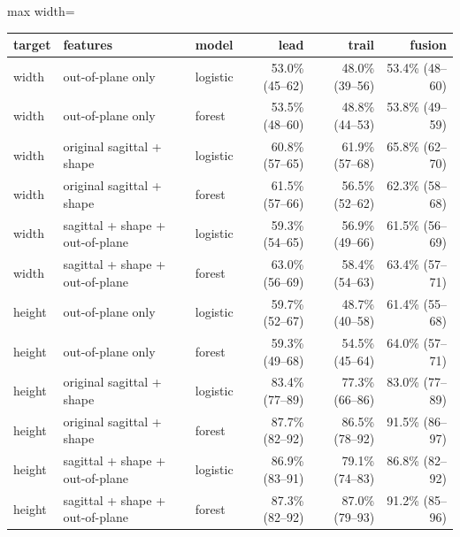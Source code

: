 \begin{adjustbox}{max width=\textwidth}
{\footnotesize
\begin{tabular}{lp{4.6cm}lrrr}
\toprule
\textbf{target} & \textbf{features} & \textbf{model} & \textbf{lead} & \textbf{trail} & \textbf{fusion} \\
\midrule
width & out-of-plane only & logistic & 53.0\% (45--62) & 48.0\% (39--56) & 53.4\% (48--60) \\
width & out-of-plane only & forest & 53.5\% (48--60) & 48.8\% (44--53) & 53.8\% (49--59) \\
width & original sagittal + shape & logistic & 60.8\% (57--65) & 61.9\% (57--68) & 65.8\% (62--70) \\
width & original sagittal + shape & forest & 61.5\% (57--66) & 56.5\% (52--62) & 62.3\% (58--68) \\
width & sagittal + shape + out-of-plane & logistic & 59.3\% (54--65) & 56.9\% (49--66) & 61.5\% (56--69) \\
width & sagittal + shape + out-of-plane & forest & 63.0\% (56--69) & 58.4\% (54--63) & 63.4\% (57--71) \\
height & out-of-plane only & logistic & 59.7\% (52--67) & 48.7\% (40--58) & 61.4\% (55--68) \\
height & out-of-plane only & forest & 59.3\% (49--68) & 54.5\% (45--64) & 64.0\% (57--71) \\
height & original sagittal + shape & logistic & 83.4\% (77--89) & 77.3\% (66--86) & 83.0\% (77--89) \\
height & original sagittal + shape & forest & 87.7\% (82--92) & 86.5\% (78--92) & 91.5\% (86--97) \\
height & sagittal + shape + out-of-plane & logistic & 86.9\% (83--91) & 79.1\% (74--83) & 86.8\% (82--92) \\
height & sagittal + shape + out-of-plane & forest & 87.3\% (82--92) & 87.0\% (79--93) & 91.2\% (85--96) \\
\bottomrule
\end{tabular}
}
\end{adjustbox}
